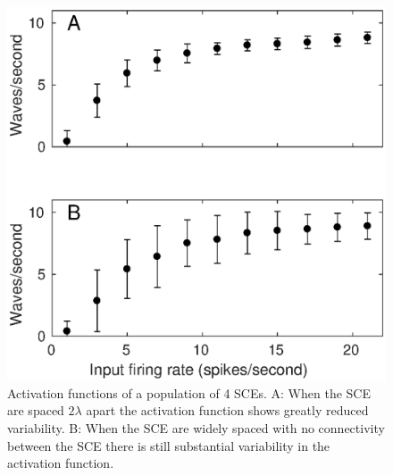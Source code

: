 \begin{figure}[!htb]
 \centering
 \includegraphics[width=\textwidth]{fig/OneLambdaFourLambda}
 \caption{Activation functions of a population of 4 SCEs. 
	    A: When the SCE are spaced $2\lambda$ apart the activation function shows greatly reduced variability. 
	    B: When the SCE are widely spaced with no connectivity between the SCE there is still substantial variability in the activation function.}
 \label{fig:sce_4x4_coupled_activation_function}
\end{figure}

\FloatBarrier


\endinput
